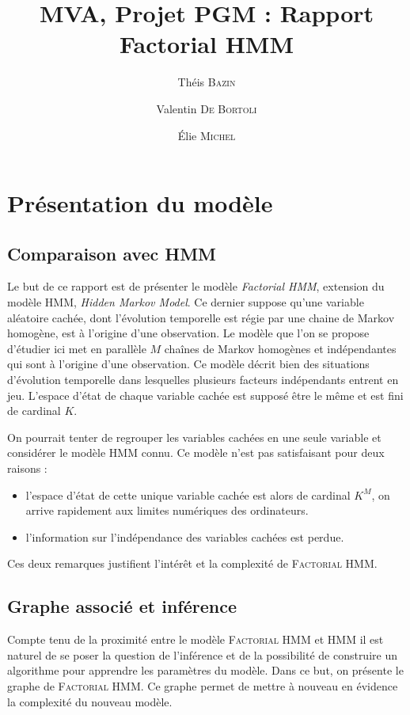 \documentclass[10pt,a4paper]{article}
\title{MVA, Projet PGM : Rapport\\
  Factorial HMM}
\author{Théis \textsc{Bazin} \and Valentin \textsc{De Bortoli} \and Élie 
\textsc{Michel}}
\newcommand{\hmm}{\textsc{HMM}}
\newcommand{\fhmm}{\textsc{Factorial HMM}}
\begin{document}
\maketitle

\section{Présentation du modèle}
\subsection{Comparaison avec HMM}
Le but de ce rapport est de présenter le modèle \emph{Factorial HMM}, extension 
du modèle \hmm, \emph{Hidden Markov Model}. Ce dernier suppose qu'une variable 
aléatoire cachée, dont l'évolution temporelle est régie par une chaine de 
Markov homogène, est à l'origine d'une observation. Le modèle que l'on se 
propose d'étudier ici met en parallèle $M$ chaînes de Markov homogènes et 
indépendantes qui sont à l'origine d'une observation. Ce modèle décrit bien
des situations d'évolution temporelle dans lesquelles plusieurs facteurs 
indépendants entrent en jeu.
L'espace d'état de chaque variable cachée est  supposé être le même et est fini
de cardinal $K$.

On pourrait tenter de regrouper les variables cachées en une seule variable et
considérer le modèle  \hmm{} connu.
Ce modèle n'est pas satisfaisant pour deux raisons :

\begin{itemize}
  \item l'espace d'état de cette unique variable cachée est alors de cardinal 
    $K^M$, on arrive rapidement aux limites numériques des ordinateurs.
  \item l'information sur l'indépendance des variables cachées est perdue.
\end{itemize}

Ces deux remarques justifient l'intérêt et la complexité de \fhmm.

\subsection{Graphe associé et inférence} 
Compte tenu de la proximité entre le modèle \fhmm{} et \hmm{} il est naturel de 
se poser la question de l'inférence et de la possibilité de construire un
algorithme pour apprendre les paramètres du modèle.
Dans ce but, on présente le graphe de \fhmm.
Ce graphe permet de mettre à nouveau en évidence la complexité du nouveau 
modèle.
\end{document}
